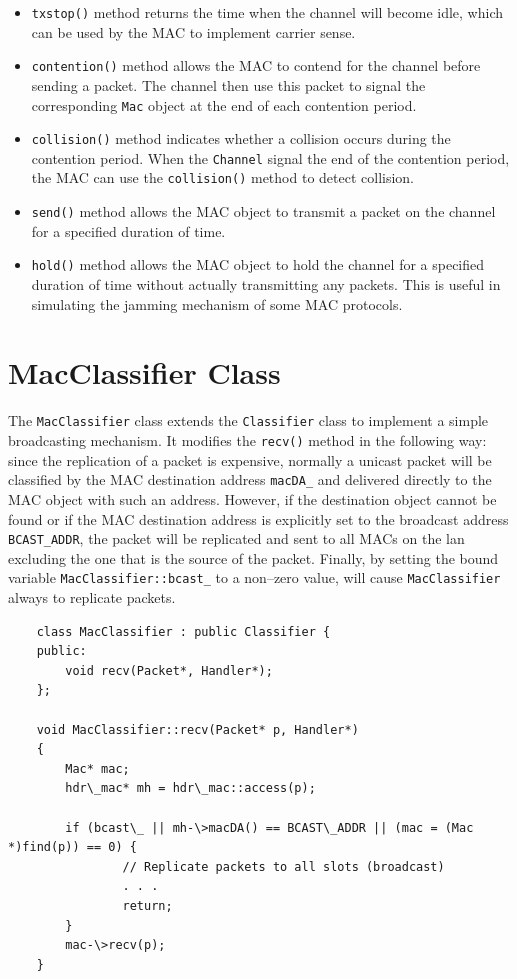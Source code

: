 \begin{itemize}
\item  {\tt txstop()} method returns the time when the channel will become
idle, which can be used by the MAC to implement carrier sense.
\item  {\tt contention()} method allows the MAC to contend for the channel
before sending a packet.  The channel then use this packet to signal the
corresponding {\tt Mac} object at the end of each contention period.
\item  {\tt collision()} method indicates whether a collision occurs
during the contention period.  When the {\tt Channel} signal the end of
the contention period, the MAC can use the {\tt collision()} method to
detect collision.
\item  {\tt send()} method allows the MAC object to transmit a packet on the
channel for a specified duration of time.
\item  {\tt hold()} method allows the MAC object to hold the channel for a
specified duration of time without actually transmitting any packets.
This is useful in simulating the jamming mechanism of some MAC
protocols.
\end{itemize}

\section{MacClassifier Class}
\label{sec:mac_classifier}

The {\tt MacClassifier} class extends the {\tt Classifier} class to
implement a simple broadcasting mechanism.  It modifies the
{\tt recv()} method in the following way: since the replication of a
packet is expensive, normally a unicast packet will be classified by
the MAC destination address {\tt macDA\_} and delivered directly to
the MAC object with such an address.  However, if the destination
object cannot be found or if the MAC destination address is explicitly
set to the broadcast address {\tt BCAST\_ADDR}, the packet will be
replicated and sent to all MACs on the lan excluding the one that is
the source of the packet.  Finally, by setting the bound variable
{\tt MacClassifier::bcast\_} to a non--zero value, will cause
{\tt MacClassifier} always to replicate packets.

\begin{verbatim}
    class MacClassifier : public Classifier {
    public:
        void recv(Packet*, Handler*);
    };

    void MacClassifier::recv(Packet* p, Handler*)
    {
        Mac* mac;
        hdr\_mac* mh = hdr\_mac::access(p);

        if (bcast\_ || mh-\>macDA() == BCAST\_ADDR || (mac = (Mac *)find(p)) == 0) {
                // Replicate packets to all slots (broadcast)
                . . .
                return;
        }
        mac-\>recv(p);
    }
\end{verbatim}


